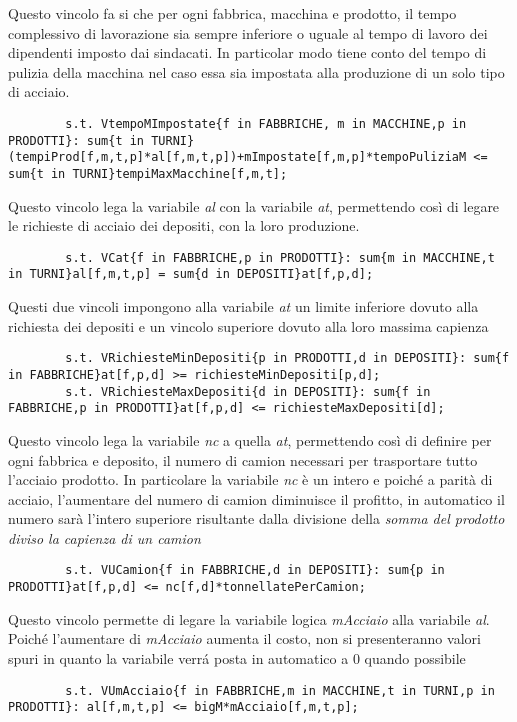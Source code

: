 \documentclass[12pt]{article} %
\begin{document}
		Questo vincolo fa si che per ogni fabbrica, macchina e prodotto, il tempo complessivo di lavorazione sia sempre inferiore o uguale al tempo di lavoro dei dipendenti imposto dai sindacati.
		In particolar modo tiene conto del tempo di pulizia della macchina nel caso essa sia impostata alla produzione di un solo tipo di acciaio.
		\begin{lstlisting}
		s.t. VtempoMImpostate{f in FABBRICHE, m in MACCHINE,p in PRODOTTI}: sum{t in TURNI}(tempiProd[f,m,t,p]*al[f,m,t,p])+mImpostate[f,m,p]*tempoPuliziaM <= sum{t in TURNI}tempiMaxMacchine[f,m,t];
		\end{lstlisting}

		Questo vincolo lega la variabile \textit{al} con la variabile \textit{at}, permettendo così di legare le richieste di acciaio dei depositi, con la loro produzione.
		\begin{lstlisting}
		s.t. VCat{f in FABBRICHE,p in PRODOTTI}: sum{m in MACCHINE,t in TURNI}al[f,m,t,p] = sum{d in DEPOSITI}at[f,p,d];
		\end{lstlisting}

		Questi due vincoli impongono alla variabile \textit{at} un limite inferiore dovuto alla richiesta dei depositi e un vincolo superiore dovuto alla loro massima capienza
		\begin{lstlisting}
		s.t. VRichiesteMinDepositi{p in PRODOTTI,d in DEPOSITI}: sum{f in FABBRICHE}at[f,p,d] >= richiesteMinDepositi[p,d];
		s.t. VRichiesteMaxDepositi{d in DEPOSITI}: sum{f in FABBRICHE,p in PRODOTTI}at[f,p,d] <= richiesteMaxDepositi[d];
		\end{lstlisting}

		Questo vincolo lega la variabile \textit{nc} a quella \textit{at}, permettendo così di definire per ogni fabbrica e deposito, il numero di camion necessari per trasportare tutto l'acciaio prodotto.
		In particolare la variabile \textit{nc} è un intero e poich\'e a parità di acciaio, l'aumentare del numero di camion diminuisce il profitto, in automatico il numero sarà l'intero superiore risultante dalla divisione della \textit{somma del prodotto diviso la capienza di un camion}
		\begin{lstlisting}
		s.t. VUCamion{f in FABBRICHE,d in DEPOSITI}: sum{p in PRODOTTI}at[f,p,d] <= nc[f,d]*tonnellatePerCamion;
		\end{lstlisting}

		Questo vincolo permette di legare la variabile logica \textit{mAcciaio} alla variabile \textit{al}.
		Poich\'e l'aumentare di \textit{mAcciaio} aumenta il costo, non si presenteranno valori spuri in quanto la variabile verr\'a posta in automatico a 0 quando possibile
		\begin{lstlisting}
		s.t. VUmAcciaio{f in FABBRICHE,m in MACCHINE,t in TURNI,p in PRODOTTI}: al[f,m,t,p] <= bigM*mAcciaio[f,m,t,p];
		\end{lstlisting}
\end{document}
